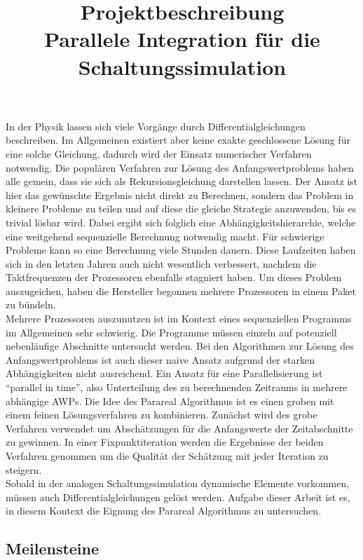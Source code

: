 \documentclass[12pt,a4paper]{article}
\title{Projektbeschreibung\\
    \large Parallele Integration für die Schaltungssimulation}
\author{}
\date{}
\begin{document}
\maketitle

In der Physik lassen sich viele Vorgänge durch Differentialgleichungen beschreiben. Im Allgemeinen existiert aber keine exakte geschlossene Lösung für eine solche Gleichung, dadurch wird der Einsatz numerischer Verfahren notwendig. Die populären Verfahren zur Lösung des Anfangswertproblems haben alle gemein, dass sie sich als Rekursionsgleichung darstellen lassen. Der Ansatz ist hier das gewünschte Ergebnis nicht direkt zu Berechnen, sondern das Problem in kleinere Probleme zu teilen und auf diese die gleiche Strategie anzuwenden, bis es trivial lösbar wird. Dabei ergibt sich folglich eine Abhängigkeitshierarchie, welche eine weitgehend sequenzielle Berechnung notwendig macht. Für schwierige Probleme kann so eine Berechnung viele Stunden dauern. Diese Laufzeiten haben sich in den letzten Jahren auch nicht wesentlich verbessert, nachdem die Taktfrequenzen der Prozessoren ebenfalls stagniert haben. Um dieses Problem auszugeichen, haben die Hersteller begonnen mehrere Prozessoren in einem Paket zu bündeln.\\
Mehrere Prozessoren auszunutzen ist im Kontext eines sequenziellen Programms im Allgemeinen sehr schwierig. Die Programme müssen einzeln auf potenziell nebenläufige Abschnitte untersucht werden. Bei den Algorithmen zur Lösung des Anfangswertproblems ist auch dieser naive Ansatz aufgrund der starken Abhängigkeiten nicht ausreichend. Ein Ansatz für eine Parallelisierung ist "`parallel in time"', also Unterteilung des zu berechnenden Zeitraums in mehrere abhängige AWPs. Die Idee des Parareal Algorithmus ist es einen groben mit einem feinen Lösungsverfahren zu kombinieren. Zunächst wird des grobe Verfahren verwendet um Abschätzungen für die Anfangswerte der Zeitabschnitte zu gewinnen. In einer Fixpunktiteration werden die Ergebnisse der beiden Verfahren genommen um die Qualität der Schätzung mit jeder Iteration zu steigern.\\
Sobald in der analogen Schaltungssimulation dynamische Elemente vorkommen, müssen auch Differentialgleichungen gelöst werden. Aufgabe dieser Arbeit ist es, in diesem Kontext die Eignung des Parareal Algorithmus zu untersuchen.

\subsection*{Meilensteine}
\end{document}
